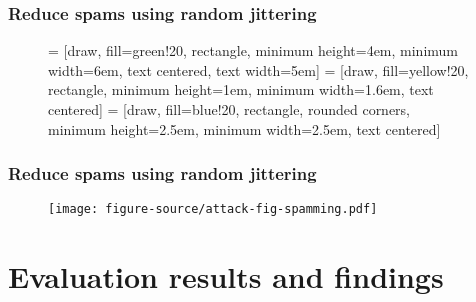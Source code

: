\documentclass[svgnames]{beamer}
\begin{document}
\begin{frame}
    \frametitle{Reduce spams using random jittering}
    \begin{figure}
         = [draw, fill=green!20, rectangle, 
        minimum height=4em, minimum width=6em, text centered, text width=5em]
         = [draw, fill=yellow!20, rectangle, minimum height=1em, minimum width=1.6em, text centered]
         = [draw, fill=blue!20, rectangle, rounded corners, minimum height=2.5em, minimum width=2.5em, text centered]
    \end{figure}
\end{frame}

\begin{frame}
    \frametitle{Reduce spams using random jittering}
    \begin{figure}
        \centering
        \texttt{[image: figure-source/attack-fig-spamming.pdf]}
    \end{figure}
\end{frame}

\section{Evaluation results and findings}


\begin{frame}
\end{frame}
\end{document}
